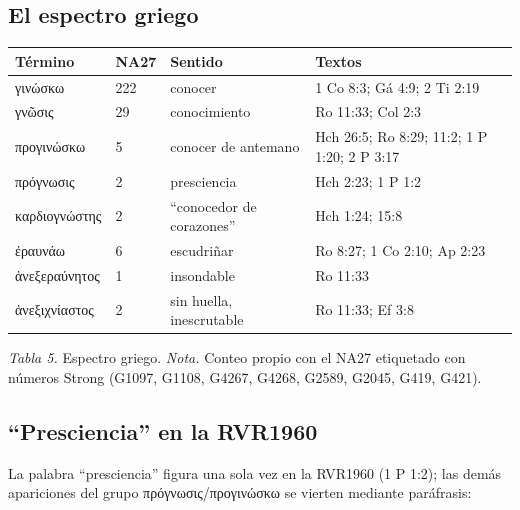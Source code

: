 \documentclass[11pt,letterpaper]{article}
\newcommand{\grc}[1]{\foreignlanguage{ancientgreek}{#1}}
\begin{document}
\subsection{El espectro griego}

\begin{center}\small\renewcommand{\arraystretch}{1.2}
\begin{tabular}{@{}L{3.0cm}L{1.0cm}L{4.4cm}L{6.0cm}@{}}
\toprule
\textbf{Término} & \textbf{NA27} & \textbf{Sentido} & \textbf{Textos} \\ \midrule
\grc{γινώσκω} & 222 & conocer & 1 Co 8:3; Gá 4:9; 2 Ti 2:19 \\
\grc{γνῶσις} & 29 & conocimiento & Ro 11:33; Col 2:3 \\
\grc{προγινώσκω} & 5 & conocer de antemano & Hch 26:5; Ro 8:29; 11:2; 1 P 1:20; 2 P 3:17 \\
\grc{πρόγνωσις} & 2 & presciencia & Hch 2:23; 1 P 1:2 \\
\grc{καρδιογνώστης} & 2 & ``conocedor de corazones'' & Hch 1:24; 15:8 \\
\grc{ἐραυνάω} & 6 & escudriñar & Ro 8:27; 1 Co 2:10; Ap 2:23 \\
\grc{ἀνεξεραύνητος} & 1 & insondable & Ro 11:33 \\
\grc{ἀνεξιχνίαστος} & 2 & sin huella, inescrutable & Ro 11:33; Ef 3:8 \\
\bottomrule
\end{tabular}\par
{\footnotesize\color{gris}\textit{Tabla 5.} Espectro griego. \textit{Nota.} Conteo propio con el NA27 etiquetado con números Strong (G1097, G1108, G4267, G4268, G2589, G2045, G419, G421).}
\end{center}

\subsection{``Presciencia'' en la RVR1960}
La palabra ``presciencia'' figura una sola vez en la RVR1960 (1 P 1:2); las demás apariciones del grupo \grc{πρόγνωσις}/\grc{προγινώσκω} se vierten mediante paráfrasis:
\end{document}
